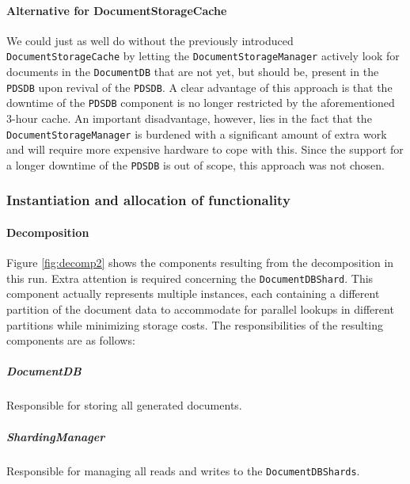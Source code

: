\documentclass[a4paper,10pt]{article}
\begin{document}
\paragraph{Alternative for DocumentStorageCache}
We could just as well do without the previously introduced \texttt{DocumentStorageCache} by letting the \texttt{DocumentStorageManager} actively look for documents in the \texttt{DocumentDB} that are not yet, but should be, present in the \texttt{PDSDB} upon revival of the \texttt{PDSDB}. A clear advantage of this approach is that the downtime of the \texttt{PDSDB} component is no longer restricted by the aforementioned 3-hour cache. An important disadvantage, however, lies in the fact that the \texttt{DocumentStorageManager} is burdened with a significant amount of extra work and will require more expensive hardware to cope with this. Since the support for a longer downtime of the \texttt{PDSDB} is out of scope, this approach was not chosen.


\subsubsection{Instantiation and allocation of functionality}
\paragraph{Decomposition}
Figure \ref{fig:decomp2} shows the components resulting from the decomposition in this run. Extra attention is required concerning the \texttt{DocumentDBShard}. This component actually represents multiple instances, each containing a different partition of the document data to accommodate for parallel lookups in different partitions while minimizing storage costs.
The responsibilities of the resulting components are as follows:

\subparagraph{DocumentDB}
Responsible for storing all generated documents.

\subparagraph{ShardingManager}
Responsible for managing all reads and writes to the \texttt{DocumentDBShards}.
\end{document}
